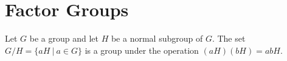 \section{Factor Groups}

\begin{theorem}
	Let $G$ be a group and let $H$ be a normal subgroup of $G$. The set $G/H = \{ aH\ \vert\ a \in G\}$ is a group under the operation $(aH)(bH) = abH$.
\end{theorem}
